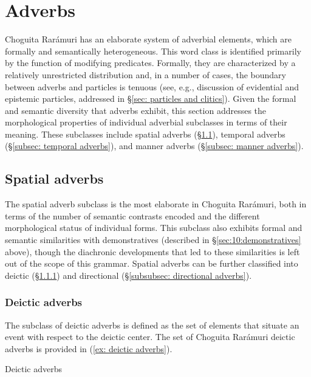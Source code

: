 \z



\section{Adverbs}
\label{sec: adverbs}

Choguita Rarámuri has an elaborate system of adverbial elements, which are formally and semantically heterogeneous. This word class is identified primarily by the function of modifying predicates. Formally, they are characterized by a relatively unrestricted distribution and, in a number of cases, the boundary between adverbs and particles is tenuous (see, e.g., discussion of evidential and epistemic particles, addressed in §\ref{sec: particles and clitics}). Given the formal and semantic diversity that adverbs exhibit, this section addresses the morphological properties of individual adverbial subclasses in terms of their meaning. These subclasses include spatial adverbs (§\ref{subsec: spatial adverbs}), temporal adverbs (§\ref{subsec: temporal adverbs}), and manner adverbs (§\ref{subsec: manner adverbs}).

\subsection{Spatial adverbs}
\label{subsec: spatial adverbs}

The spatial adverb subclass is the most elaborate in Choguita Rarámuri, both in terms of the number of semantic contrasts encoded and the different morphological status of individual forms. This subclass also exhibits formal and semantic similarities with demonstratives (described in §\ref{sec:10:demonstratives} above), though the diachronic developments that led to these similarities is left out of the scope of this grammar. Spatial adverbs can be further classified into deictic (§\ref{subsubsec: deictic adverbs}) and directional (§\ref{subsubsec: directional adverbs}).

\subsubsection{Deictic adverbs}
\label{subsubsec: deictic adverbs}

The subclass of deictic adverbs is defined as the set of elements that situate an event with respect to the deictic center. The set of Choguita Rarámuri deictic adverbs is provided in (\ref{ex: deictic adverbs}).

\ea\label{ex: deictic adverbs}
{Deictic adverbs}

